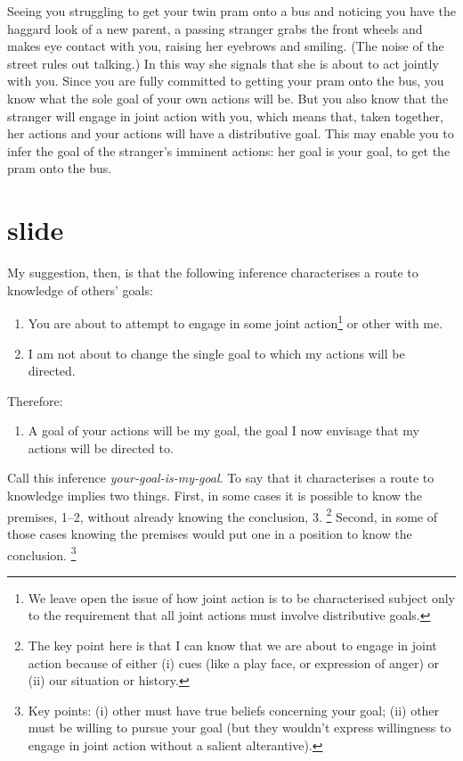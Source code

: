 \documentclass[12pt,\papersize]{extarticle}
\begin{document}
Seeing you struggling to get your twin pram onto a bus and noticing you have the haggard look of a new parent, a passing stranger  grabs the front wheels and makes eye contact with you, raising her eyebrows and smiling.
(The noise of the street rules out talking.)   
In this way she signals that she is about to act jointly with you.   
Since you are fully committed to getting your pram onto the bus,
you know what the sole goal of your own actions will be.
But you also know that the stranger will engage in joint action with you,
which means that, taken together, her actions and your actions will have a distributive goal.
This may enable you to infer the goal of the stranger's imminent actions: 
her goal is your goal, to get the pram onto the bus.


\section{slide}
My suggestion, then, is that the following inference characterises a route to knowledge of others’ goals:
%
\begin{enumerate}
\label{your_goal_is_my_goal}
\item You are 
about to attempt to 
engage in some joint action\footnote{
We leave open the issue of how joint action is to be characterised subject only to the 
requirement that all joint actions must involve distributive goals.}
or other with me.

\item I am not about to change the single goal to which my actions will be directed.

\end{enumerate}
%
Therefore:
%
\begin{enumerate}[resume]
%
\item A goal of your actions will be my goal, the goal I now envisage that my actions will be directed to.
\end{enumerate}
%
Call this inference \emph{your-goal-is-my-goal}.  
To say that it characterises a route to knowledge implies two things.  
First, in some cases it is possible to know the premises, 1–2, without already knowing the conclusion, 3.%
\footnote{
The key point here is that I can know that we are about to engage in joint action because of either (i) cues (like a play face, or expression of anger) or (ii) our situation or history.
}
%
Second, in some of those cases knowing the premises would put one in a position to know the conclusion.%
\footnote{
Key points: (i) other must have true beliefs concerning your goal; (ii) other must be willing to pursue your goal (but they wouldn't express willingness to engage in joint action without a salient alterantive).
}
%
  
\end{document}
